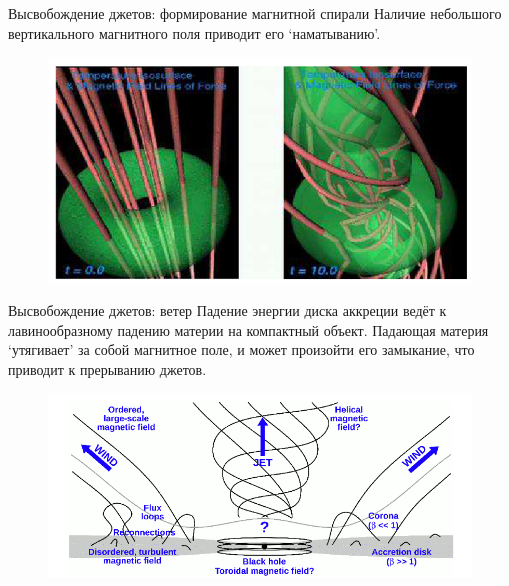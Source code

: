 \documentclass[8pt]{beamer}
\begin{document}
\begin{frame}{Высвобождение джетов: формирование магнитной спирали}
    Наличие небольшого вертикального магнитного поля приводит его `наматыванию'.\pause
    \begin{figure}
        \centering
        \includegraphics[width=\textwidth]{resources/magnetic-winding.png}
    \end{figure}
\end{frame}

\begin{frame}{Высвобождение джетов: ветер}
    Падение энергии диска аккреции ведёт к лавинообразному падению материи на компактный объект.
    Падающая материя `утягивает' за собой магнитное поле, и может произойти его замыкание, что
    приводит к прерыванию джетов.
    \begin{figure}
        \centering
        \includegraphics[width=\textwidth]{resources/jet-accretion-interaction.png}
    \end{figure}
    
\end{frame}
\end{document}
